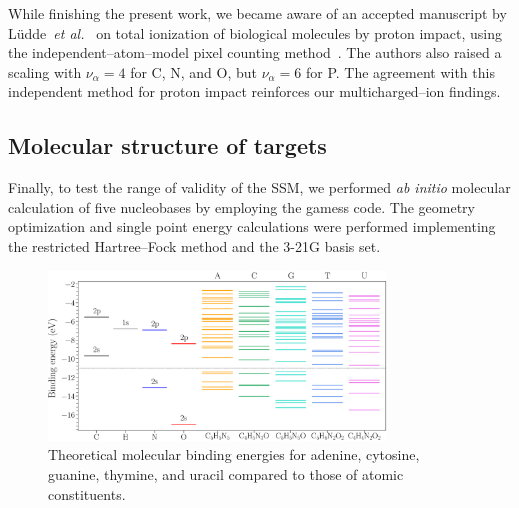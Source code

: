 \documentclass[10pt,showpacs,showkeys,twocolumn]{revtex4}
\begin{document}
While finishing the present work, we became aware of an accepted manuscript by 
L\"udde~{\it et al.}~\cite{ludde2019} on total ionization of biological
molecules by proton impact, using the independent--atom--model pixel counting
method~\cite{ludde2016,ludde2018}. The authors also raised a scaling 
with $\nu_{\alpha}=4$ 
for C, N, and O, but $\nu_{\alpha}=6$ for P. The agreement with this 
independent method for proton impact reinforces our multicharged--ion findings.

\subsection{Molecular structure of targets}
\label{subsec:molcalculations}

Finally, to test the range of validity of the SSM, we performed {\it ab initio}
molecular calculation of five nucleobases by employing the {\sc gamess} 
code. The geometry optimization and single point energy calculations 
were performed implementing the restricted Hartree--Fock method and the 
3-21G basis set. 

\begin{figure}[t]
\centering
\includegraphics[width=0.8\textwidth]{figuras/levelsDNA.eps}
\caption{Theoretical molecular binding energies for adenine, cytosine, 
guanine, thymine, and uracil compared to those of atomic constituents.}
\label{fig:bindener}
\end{figure}
\end{document}
